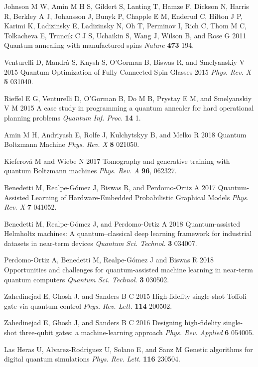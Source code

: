 \documentclass[12pt]{iopart}
\begin{document}
\begin{thebibliography}{999}
 Johnson M W, Amin M H S, Gildert S, Lanting T, Hamze F, Dickson N, Harris R, Berkley A J, Johansson J, Bunyk P, Chapple E M, Enderud C, Hilton J P, Karimi K, Ladizinsky E,  Ladizinsky N, Oh T, Perminov I, Rich C, Thom M C, Tolkacheva E, Truncik C J S, Uchaikin S, Wang J, Wilson B, and Rose G 2011 Quantum annealing with manufactured spins {\it Nature} {\bf 473} 194.

 Venturelli D, Mandr\`a S, Knysh S, O'Gorman B, Biswas R, and Smelyanskiy V 2015 Quantum Optimization of Fully Connected Spin Glasses 2015 {\it Phys. Rev. X} {\bf 5} 031040. 

  Rieffel E G, Venturelli D, O'Gorman B, Do M B, Prystay E M, and Smelyanskiy V M 2015 A case study in programming a quantum annealer for hard operational planning problems {\it Quantum Inf. Proc.} {\bf 14} 1.

 Amin M H, Andriyash E, Rolfe J, Kulchytskyy B, and Melko R 2018 Quantum Boltzmann Machine {\it Phys. Rev. X} {\bf 8} 021050.

 Kieferov\'a M and Wiebe N 2017 Tomography and generative training with quantum Boltzmann machines {\it Phys. Rev. A} {\bf 96}, 062327.

 Benedetti M, Realpe-G\'omez J, Biswas R, and Perdomo-Ortiz A 2017 Quantum-Assisted Learning of Hardware-Embedded Probabilistic Graphical Models {\it Phys. Rev. X} {\bf 7} 041052.

 Benedetti M, Realpe-G\'omez J, and Perdomo-Ortiz A 2018 Quantum-assisted Helmholtz machines: A quantum–classical deep learning framework for industrial datasets in near-term devices {\it Quantum Sci. Technol.} {\bf 3} 034007.

 Perdomo-Ortiz A, Benedetti M, Realpe-G\'omez J and Biswas R 2018 Opportunities and challenges for quantum-assisted machine learning in near-term quantum computers {\it Quantum Sci. Technol.} {\bf 3} 030502.

 Zahedinejad E, Ghosh J, and Sanders B C 2015 High-fidelity single-shot Toffoli gate via quantum control
{\it Phys. Rev. Lett.} {\bf 114} 200502.

 Zahedinejad E, Ghosh J, and Sanders B C 2016 Designing high-fidelity single-shot three-qubit gates: a machine-learning approach {\it Phys. Rev. Applied} {\bf 6} 054005.

 Las Heras U, Alvarez-Rodriguez U, Solano E, and Sanz M Genetic algorithms for digital quantum simulations {\it Phys. Rev. Lett.} {\bf 116} 230504.	


\end{thebibliography}
\end{document}
